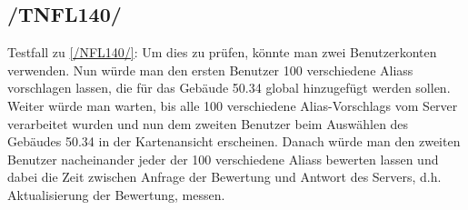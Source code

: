 \subsection*{/TNFL140/}
\label{/TNFL140/} Testfall zu \ref{/NFL140/}: Um dies zu prüfen, könnte man zwei \Gls{Benutzer}konten verwenden. Nun würde man den ersten \Gls{Benutzer} 100 verschiedene \Glspl{Alias} vorschlagen lassen, die für das Gebäude 50.34 \gls{global} hinzugefügt werden sollen. Weiter würde man warten, bis alle 100 verschiedene \Glspl{Alias-Vorschlag} vom \Gls{Server} verarbeitet wurden und nun dem zweiten \Gls{Benutzer} beim Auswählen des Gebäudes 50.34 in der \Gls{Kartenansicht} erscheinen. Danach würde man den zweiten \Gls{Benutzer} nacheinander jeder der 100 verschiedene \Glspl{Alias} bewerten lassen und dabei die Zeit zwischen Anfrage der Bewertung und Antwort des \Gls{Server}s, d.h. Aktualisierung der Bewertung, messen.
